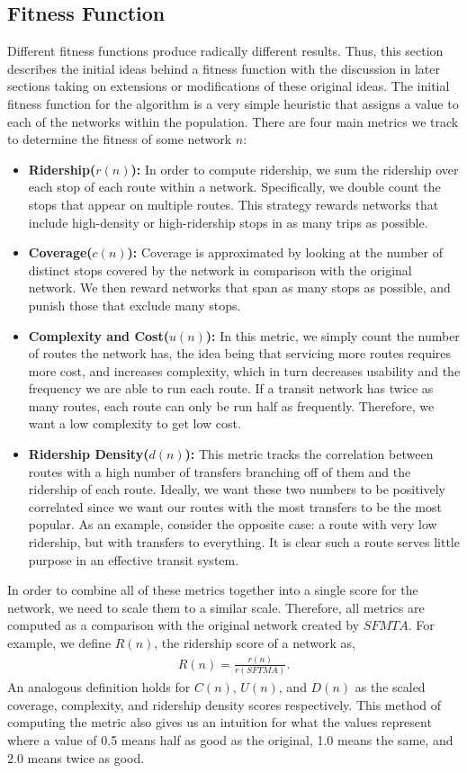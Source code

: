 \documentclass[11pt]{amsart}
\theoremstyle{definition}                  %
\theoremstyle{remark}                       %
\numberwithin{equation}{section}
\begin{document}
\subsection{Fitness Function}
Different fitness functions produce radically different results. Thus, this section describes the initial ideas behind a fitness function with the discussion in later sections taking on extensions or modifications of these original ideas. The initial fitness function for the algorithm is a very simple heuristic that assigns a value to each of the networks within the population. There are four main metrics we track to determine the fitness of some network $n$:
\begin{itemize}
    \item \textbf{Ridership($r(n)$):} In order to compute ridership, we sum the ridership over each stop of each route within a network. Specifically, we double count the stops that appear on multiple routes. This strategy rewards networks that include high-density or high-ridership stops in as many trips as possible. 
    \item \textbf{Coverage($c(n)$):} Coverage is approximated by looking at the number of distinct stops covered by the network in comparison with the original network. We then reward networks that span as many stops as possible, and punish those that exclude many stops. 
    \item \textbf{Complexity and Cost($u(n)$):} In this metric, we simply count the number of routes the network has, the idea being that servicing more routes requires more cost, and increases complexity, which in turn decreases usability and the frequency we are able to run each route. If a transit network has twice as many routes, each route can only be run half as frequently. Therefore, we want a low complexity to get low cost. 
    \item \textbf{Ridership Density($d(n)$):} This metric tracks the correlation between routes with a high number of transfers branching off of them and the ridership of each route. Ideally, we want these two numbers to be positively correlated since we want our routes with the most transfers to be the most popular. As an example, consider the opposite case: a route with very low ridership, but with transfers to everything. It is clear such a route serves little purpose in an effective transit system. 
\end{itemize}
In order to combine all of these metrics together into a single score for the network, we need to scale them to a similar scale. Therefore, all metrics are computed as a comparison with the original network created by $SFMTA$. For example, we define $R(n)$, the ridership score of a network as, 
\begin{align*}
R(n) = \frac{r(n)}{r(SFTMA)}.
\end{align*}
An analogous definition holds for $C(n)$, $U(n)$, and $D(n)$ as the scaled coverage, complexity, and ridership density scores respectively. This method of computing the metric also gives us an intuition for what the values represent where a value of 0.5 means half as good as the original, 1.0 means the same, and 2.0 means twice as good. 
\end{document}
